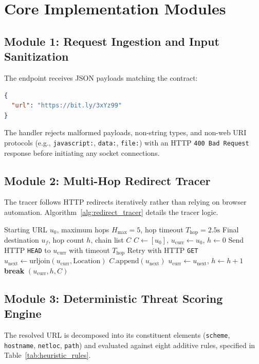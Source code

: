 \documentclass[12pt,a4paper]{report}
\begin{document}
\chapter{Core Implementation Modules}

\section{Module 1: Request Ingestion and Input Sanitization}
The endpoint receives JSON payloads matching the contract:
\begin{lstlisting}[language=json,caption={Validation request schema}]
{
  "url": "https://bit.ly/3xYz99"
}
\end{lstlisting}
The handler rejects malformed payloads, non-string types, and non-web URI protocols (e.g., \texttt{javascript:}, \texttt{data:}, \texttt{file:}) with an HTTP \texttt{400 Bad Request} response before initiating any socket connections.

\section{Module 2: Multi-Hop Redirect Tracer}
The tracer follows HTTP redirects iteratively rather than relying on browser automation. Algorithm~\ref{alg:redirect_tracer} details the tracer logic.

\begin{algorithm}[htbp]
\caption{Multi-Hop Redirect Tracer}
\label{alg:redirect_tracer}
\begin{algorithmic}[1]
\Require Starting URL $u_0$, maximum hops $H_{\max} = 5$, hop timeout $T_{\text{hop}} = 2.5\text{s}$
\Ensure Final destination $u_f$, hop count $h$, chain list $C$
\State $C \gets [u_0]$, $u_{\text{curr}} \gets u_0$, $h \gets 0$
    \State Send HTTP \texttt{HEAD} to $u_{\text{curr}}$ with timeout $T_{\text{hop}}$
        \State Retry with HTTP \texttt{GET}
    \EndIf
        \State $u_{\text{next}} \gets \text{urljoin}(u_{\text{curr}}, \text{Location})$
        \State $C.\text{append}(u_{\text{next}})$
        \State $u_{\text{curr}} \gets u_{\text{next}}$, $h \gets h + 1$
    \Else
        \State \textbf{break}
    \EndIf
\EndWhile
\State \Return $(u_{\text{curr}}, h, C)$
\end{algorithmic}
\end{algorithm}

\section{Module 3: Deterministic Threat Scoring Engine}
The resolved URL is decomposed into its constituent elements (\texttt{scheme}, \texttt{hostname}, \texttt{netloc}, \texttt{path}) and evaluated against eight additive rules, specified in Table~\ref{tab:heuristic_rules}.
\end{document}
